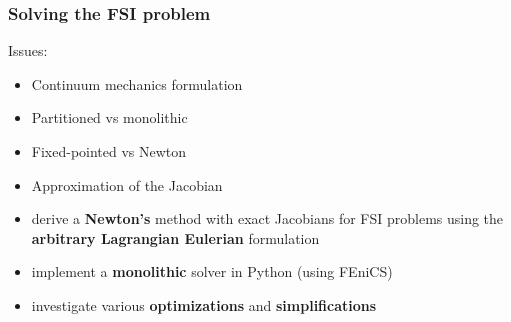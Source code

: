 \begin{frame}
  \frametitle{Solving the FSI problem}

  Issues:
  \begin{itemize}
  \item<2->
    Continuum mechanics formulation
  \item<3->
    Partitioned vs monolithic
  \item<4->
    Fixed-pointed vs Newton
  \item<6->
    Approximation of the Jacobian
  
  \end{itemize}

  \bigskip


  \begin{itemize}
  \item<7->
    derive a \textbf{Newton's} method with exact Jacobians for FSI problems
    using the \textbf{arbitrary Lagrangian Eulerian} formulation
  \item<8->
    implement a \textbf{monolithic} solver in Python (using FEniCS)
  \item<9->
    investigate various \textbf{optimizations} and \textbf{simplifications}
  \end{itemize}

\end{frame}
